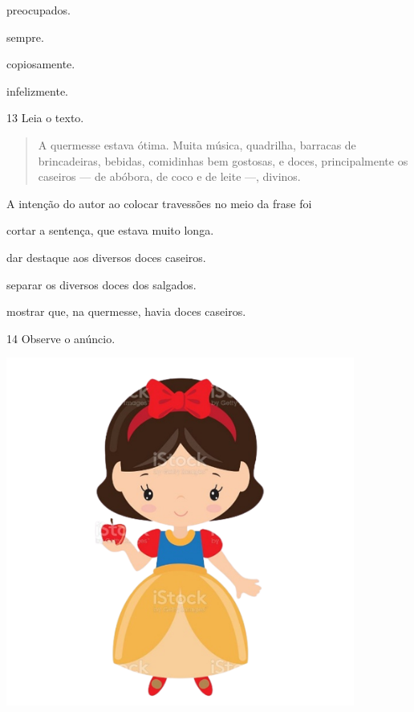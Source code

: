 \begin{escolha}
\item preocupados.

\item sempre.

\item copiosamente.

\item infelizmente.
\end{escolha}

\num{13} Leia o texto.

\begin{quote}
A quermesse estava ótima. Muita música, quadrilha, barracas de
brincadeiras, bebidas, comidinhas bem gostosas, e doces, principalmente
os caseiros --- de abóbora, de coco e de leite ---, divinos.
\end{quote}

A intenção do autor ao colocar travessões no meio da frase foi

\begin{escolha}
\item cortar a sentença, que estava muito longa.

\item dar destaque aos diversos doces caseiros.

\item separar os diversos doces dos salgados.

\item mostrar que, na quermesse, havia doces caseiros.
\end{escolha}

\num{14} Observe o anúncio.

\includegraphics[width=4.50972in,height=4.50972in]{media/image6.png}

